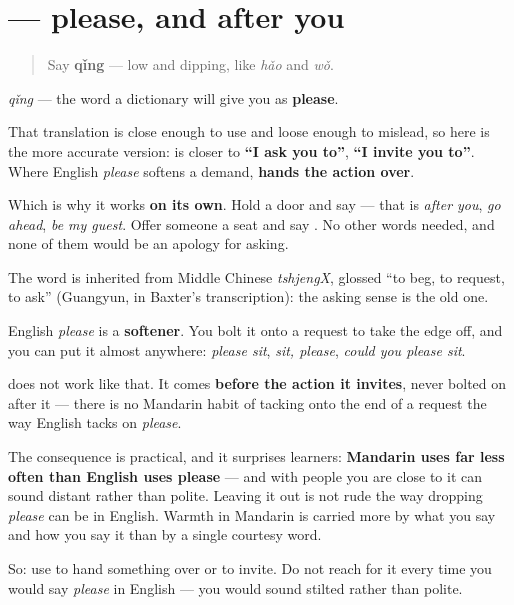 \section[\texorpdfstring{\zh{请} (qǐng)}{请 (qǐng)}]{ — please, and after you}

\label{lesson:ZH-C11-qing}



\begin{quote}
Say \textbf{qǐng} — low and dipping, like \emph{hǎo} and \emph{wǒ}.
\end{quote}

\begin{cousinweb}
\textbf{} \emph{qǐng} — the word a dictionary will give you as \textbf{please}.

That translation is close enough to use and loose enough to mislead, so here is the more accurate version:  is closer to \textbf{\textquotedblleft{}I ask you to\textquotedblright{}}, \textbf{\textquotedblleft{}I invite you to\textquotedblright{}}. Where English \emph{please} softens a demand,  \textbf{hands the action over}.

Which is why it works \textbf{on its own}. Hold a door and say  — that is \emph{after you}, \emph{go ahead}, \emph{be my guest}. Offer someone a seat and say . No other words needed, and none of them would be an apology for asking.

The word is inherited from Middle Chinese \emph{tshjengX}, glossed \textquotedblleft{}to beg, to request, to ask\textquotedblright{} (Guangyun, in Baxter's transcription): the asking sense is the old one.
\end{cousinweb}

\begin{culture}
English \emph{please} is a \textbf{softener}. You bolt it onto a request to take the edge off, and you can put it almost anywhere: \emph{please sit}, \emph{sit, please}, \emph{could you please sit}.

 does not work like that. It comes \textbf{before the action it invites}, never bolted on after it — there is no Mandarin habit of tacking  onto the end of a request the way English tacks on \emph{please}.

The consequence is practical, and it surprises learners: \textbf{Mandarin uses  far less often than English uses please} — and with people you are close to it can sound distant rather than polite. Leaving it out is not rude the way dropping \emph{please} can be in English. Warmth in Mandarin is carried more by what you say and how you say it than by a single courtesy word.

So: use  to hand something over or to invite. Do not reach for it every time you would say \emph{please} in English — you would sound stilted rather than polite.
\end{culture}

